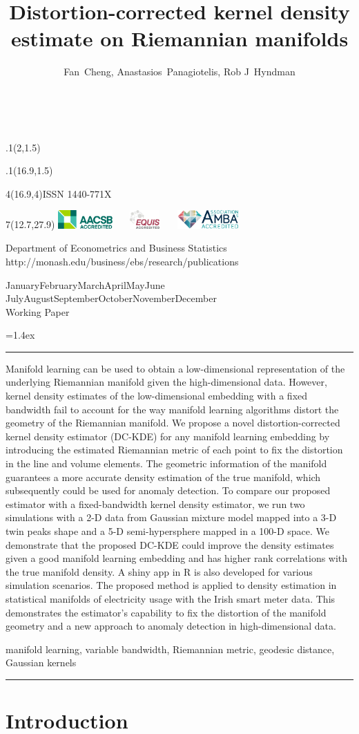\documentclass[11pt,a4paper,]{article}
\title{Distortion-corrected kernel density estimate on Riemannian manifolds}
\author{Fan~Cheng, Anastasios~Panagiotelis, Rob J~Hyndman}
\date{\sf\Date~\Month~\Year}
\makeatletter
\def\Date{\number\day}
\def\Month{\ifcase\month\or
 January\or February\or March\or April\or May\or June\or
 July\or August\or September\or October\or November\or December\fi}
\def\Year{\number\year}
\def\showjel{{\large\textsf{\textbf{JEL classification:}}~\@jel}}
\def\cover{{\sffamily\setcounter{page}{0}
        \thispagestyle{empty}
        \placefig{2}{1.5}{width=5cm}{monash2}
        \placefig{16.9}{1.5}{width=2.1cm}{MBusSchool}
        \begin{textblock}{4}(16.9,4)ISSN 1440-771X\end{textblock}
        \begin{textblock}{7}(12.7,27.9)\hfill
        \includegraphics[height=0.7cm]{AACSB}~~~
        \includegraphics[height=0.7cm]{EQUIS}~~~
        \includegraphics[height=0.7cm]{AMBA}
        \end{textblock}
        \vspace*{2cm}
        \begin{center}\Large
        Department of Econometrics and Business Statistics\\[.5cm]
        \footnotesize http://monash.edu/business/ebs/research/publications
        \end{center}\vspace{2cm}
        \begin{center}
        \fbox{\parbox{14cm}{\begin{onehalfspace}\centering\Huge\vspace*{0.3cm}
                \textsf{\textbf{\expandafter{\@title}}}\vspace{1cm}\par
                \LARGE\@author\end{onehalfspace}
        }}
        \end{center}
        \vfill
                \begin{center}\Large
                \Month~\Year\\[1cm]
                Working Paper \@wp
        \end{center}\vspace*{2cm}}}
\def\pageone{{\sffamily\setstretch{1}%
        \thispagestyle{empty}%
        \vbox to \textheight{%
        \raggedright\baselineskip=1.2cm
     {\fontsize{24.88}{30}\sffamily\textbf{\expandafter{\@title}}}
        \vspace{2cm}\par
        \hspace{1cm}\parbox{14cm}{\sffamily\large\@addresses}\vspace{1cm}\vfill
        \hspace{1cm}{\large\Date~\Month~\Year}\\[1cm]
        \hspace{1cm}\showjel\vss}}}
\def\blindtitle{{\sffamily
     \thispagestyle{plain}\raggedright\baselineskip=1.2cm
     {\fontsize{24.88}{30}\sffamily\textbf{\expandafter{\@title}}}\vspace{1cm}\par
        }}
\def\titlepage{{\cover\newpage\pageone\newpage\blindtitle}}
\let\maketitle\titlepage
\newenvironment{keywords}{\par\vspace{0.5cm}\noindent{\sffamily\textbf{Keywords:}}}{\vspace{0.25cm}\par\hrule\vspace{0.5cm}\par}
\renewenvironment{abstract}{\begin{minipage}{\textwidth}\parskip=1.4ex\noindent
\hrule\vspace{0.1cm}\par{\sffamily\textbf{\abstractname}}\newline}
  {\end{minipage}}
\def\placefig#1#2#3#4{\begin{textblock}{.1}(#1,#2)\rlap{\texttt{[image: \#4]}}\end{textblock}}
\makeatother
\begin{document}
\maketitle
\begin{abstract}
Manifold learning can be used to obtain a low-dimensional representation of the underlying Riemannian manifold given the high-dimensional data. However, kernel density estimates of the low-dimensional embedding with a fixed bandwidth fail to account for the way manifold learning algorithms distort the geometry of the Riemannian manifold. We propose a novel distortion-corrected kernel density estimator (DC-KDE) for any manifold learning embedding by introducing the estimated Riemannian metric of each point to fix the distortion in the line and volume elements. The geometric information of the manifold guarantees a more accurate density estimation of the true manifold, which subsequently could be used for anomaly detection. To compare our proposed estimator with a fixed-bandwidth kernel density estimator, we run two simulations with a 2-D data from Gaussian mixture model mapped into a 3-D twin peaks shape and a 5-D semi-hypersphere mapped in a 100-D space. We demonstrate that the proposed DC-KDE could improve the density estimates given a good manifold learning embedding and has higher rank correlations with the true manifold density. A shiny app in R is also developed for various simulation scenarios. The proposed method is applied to density estimation in statistical manifolds of electricity usage with the Irish smart meter data. This demonstrates the estimator's capability to fix the distortion of the manifold geometry and a new approach to anomaly detection in high-dimensional data.
\end{abstract}
\begin{keywords}
manifold learning, variable bandwidth, Riemannian metric, geodesic distance, Gaussian kernels
\end{keywords}

\newpage

\hypertarget{introduction}{%
\section{Introduction}\label{introduction}}
\end{document}
